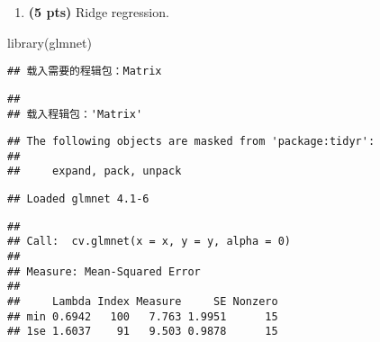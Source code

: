 \documentclass[
]{article}
\newenvironment{Shaded}{\begin{snugshade}}{\end{snugshade}}
\newcommand{\AttributeTok}[1]{\textcolor[rgb]{0.77,0.63,0.00}{#1}}
\newcommand{\DecValTok}[1]{\textcolor[rgb]{0.00,0.00,0.81}{#1}}
\newcommand{\FunctionTok}[1]{\textcolor[rgb]{0.00,0.00,0.00}{#1}}
\newcommand{\NormalTok}[1]{#1}
\newcommand{\OtherTok}[1]{\textcolor[rgb]{0.56,0.35,0.01}{#1}}
\newcommand{\SpecialCharTok}[1]{\textcolor[rgb]{0.00,0.00,0.00}{#1}}
\providecommand{\tightlist}{%
  \setlength{\itemsep}{0pt}\setlength{\parskip}{0pt}}
\begin{document}
\begin{enumerate}
\def\labelenumi{(\alph{enumi})}
\setcounter{enumi}{1}
\tightlist
\item
  \textbf{(5 pts)} Ridge regression.
\end{enumerate}

\begin{Shaded}
\begin{Highlighting}[]
\FunctionTok{library}\NormalTok{(glmnet)}
\end{Highlighting}
\end{Shaded}

\begin{verbatim}
## 载入需要的程辑包：Matrix
\end{verbatim}

\begin{verbatim}
## 
## 载入程辑包：'Matrix'
\end{verbatim}

\begin{verbatim}
## The following objects are masked from 'package:tidyr':
## 
##     expand, pack, unpack
\end{verbatim}

\begin{verbatim}
## Loaded glmnet 4.1-6
\end{verbatim}

\begin{Shaded}
\end{Shaded}

\begin{verbatim}
## 
## Call:  cv.glmnet(x = x, y = y, alpha = 0) 
## 
## Measure: Mean-Squared Error 
## 
##     Lambda Index Measure     SE Nonzero
## min 0.6942   100   7.763 1.9951      15
## 1se 1.6037    91   9.503 0.9878      15
\end{verbatim}

\begin{Shaded}
\end{Shaded}
\end{document}
